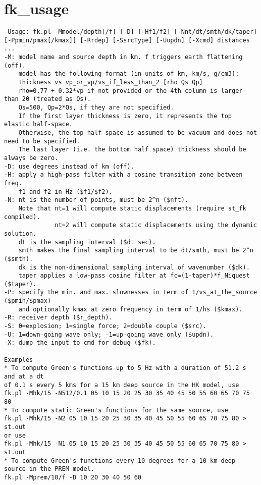 \documentclass[11pt,titlepage,fleqn]{article}
\begin{document}
\section{fk\_usage}
\begin{verbatim} Usage: fk.pl -Mmodel/depth[/f] [-D] [-Hf1/f2] [-Nnt/dt/smth/dk/taper] 
[-Ppmin/pmax[/kmax]] [-Rrdep] [-SsrcType] [-Uupdn] [-Xcmd] distances ...
-M: model name and source depth in km. f triggers earth flattening (off).
    model has the following format (in units of km, km/s, g/cm3):
	thickness vs vp_or_vp/vs_if_less_than_2 [rho Qs Qp]
	rho=0.77 + 0.32*vp if not provided or the 4th column is larger than 20 (treated as Qs).
	Qs=500, Qp=2*Qs, if they are not specified.
	If the first layer thickness is zero, it represents the top elastic half-space.
	Otherwise, the top half-space is assumed to be vacuum and does not need to be specified.
	The last layer (i.e. the bottom half space) thickness should be always be zero.
-D: use degrees instead of km (off).
-H: apply a high-pass filter with a cosine transition zone between freq. 
    f1 and f2 in Hz ($f1/$f2).
-N: nt is the number of points, must be 2^n ($nft).
    Note that nt=1 will compute static displacements (require st_fk compiled).
              nt=2 will compute static displacements using the dynamic solution.
    dt is the sampling interval ($dt sec).
    smth makes the final sampling interval to be dt/smth, must be 2^n ($smth).
    dk is the non-dimensional sampling interval of wavenumber ($dk).
    taper applies a low-pass cosine filter at fc=(1-taper)*f_Niquest ($taper).
-P: specify the min. and max. slownesses in term of 1/vs_at_the_source ($pmin/$pmax)
    and optionally kmax at zero frequency in term of 1/hs ($kmax).
-R: receiver depth ($r_depth).
-S: 0=explosion; 1=single force; 2=double couple ($src).
-U: 1=down-going wave only; -1=up-going wave only ($updn).
-X: dump the input to cmd for debug ($fk).

Examples
* To compute Green's functions up to 5 Hz with a duration of 51.2 s and at a dt
of 0.1 s every 5 kms for a 15 km deep source in the HK model, use
fk.pl -Mhk/15 -N512/0.1 05 10 15 20 25 30 35 40 45 50 55 60 65 70 75 80
* To compute static Green's functions for the same source, use
fk.pl -Mhk/15 -N2 05 10 15 20 25 30 35 40 45 50 55 60 65 70 75 80 > st.out
or use
fk.pl -Mhk/15 -N1 05 10 15 20 25 30 35 40 45 50 55 60 65 70 75 80 > st.out
* To compute Green's functions every 10 degrees for a 10 km deep source in the PREM model.
fk.pl -Mprem/10/f -D 10 20 30 40 50 60
\end{verbatim}
\end{document}
